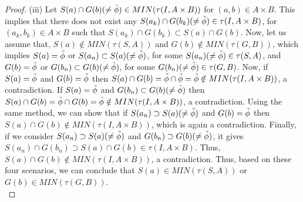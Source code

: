 \documentclass{article}
\theoremstyle{definition}
\begin{document}
\begin{proof}
(iii) Let $S(a)\cap G(b)(\neq \Tilde{\phi})\in MIN(\tau(I,A\times B))$ for $(a, b)\in A\times B$. This implies that there does not exist any $S(a_k)\cap G(b_k)(\neq \Tilde{\phi})\in \tau(I,A\times B)$, for $(a_k, b_k)\in A\times B$ such that $S(a_k)\cap G(b_k)\subset S(a)\cap G(b)$. Now, let us assume that, $S(a) \notin MIN(\tau(S,A))$ and $G(b) \notin MIN(\tau(G,B))$, which implies $S(a)= \Tilde{\phi}$ or $S(a_n)\subset S(a)(\neq \Tilde{\phi})$, for some $S(a_n) (\neq \Tilde{\phi}) \in \tau(S,A)$, and $G(b)= \Tilde{\phi}$ or $G(b_n)\subset G(b)(\neq \Tilde{\phi})$, for some  $G(b_n) (\neq \Tilde{\phi}) \in \tau(G,B)$. Now, if $S(a)= \Tilde{\phi}$ and $G(b)= \Tilde{\phi}$ then $S(a) \cap G(b)= \Tilde{\phi} \cap \Tilde{\phi}=\Tilde{\phi}\notin MIN(\tau(I,A\times B))$, a contradiction. If $S(a)= \Tilde{\phi}$ and $G(b_n)\subset G(b)(\neq \Tilde{\phi})$ then $S(a) \cap G(b)= \Tilde{\phi} \cap G(b)= \Tilde{\phi}\notin MIN(\tau(I,A\times B))$, a contradiction. Using the same method, we can show that if $S(a_n)\supset S(a)(\neq \Tilde{\phi})$ and $G(b)= \Tilde{\phi}$ then $S(a)\cap G(b)\notin MIN(\tau(I,A\times B))$, which is again a contradiction. Finally, if we consider $S(a_n)\supset S(a)(\neq \Tilde{\phi})$ and $G(b_n)\supset G(b)(\neq \Tilde{\phi})$, it gives $S(a_n)\cap G(b_n) \supset S(a)\cap G(b) \in \tau(I, A\times B)$. Thus, $S(a)\cap G(b) \notin MIN(\tau(I,A\times B))$, a contradiction. Thus, based on these four scenarios, we can conclude that $S(a)\in MIN(\tau(S,A))$ or $G(b)\in MIN(\tau(G,B))$.\\
    
\end{proof}
\end{document}

